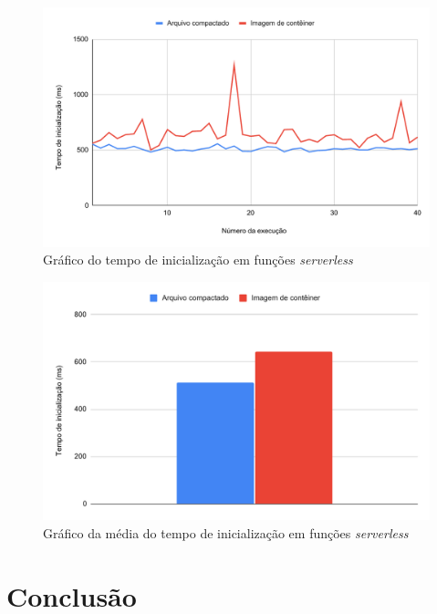 \documentclass[conference]{IEEEtran}
\begin{document}
\begin{figure}[H]
    \centering 
    \includegraphics [width=\linewidth]{images/init-time-PT.pdf}
    \par
    \caption{Gráfico do tempo de inicialização em funções \textit{serverless}}
    \label{graph:functions_init_time}
\end{figure}

\begin{figure}[H]
    \centering 
    \includegraphics [width=\linewidth]{images/init-time-average-PT.pdf}
    \par
    \caption{Gráfico da média do tempo de inicialização em funções \textit{serverless}}
    \label{graph:functions_init_time_average}
\end{figure}

\section{Conclusão}
\label{sec:Conclusion}
\end{document}
